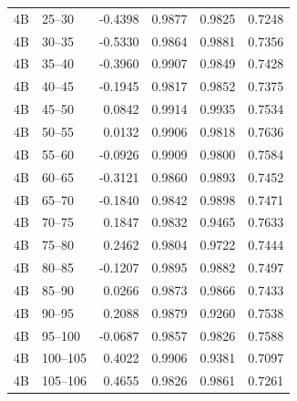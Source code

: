 \begin{table}[!htbp]
\begin{tabular}{llrrrr}
4B & 25--30 & -0.4398 & 0.9877 & 0.9825 & 0.7248 \\
4B & 30--35 & -0.5330 & 0.9864 & 0.9881 & 0.7356 \\
4B & 35--40 & -0.3960 & 0.9907 & 0.9849 & 0.7428 \\
4B & 40--45 & -0.1945 & 0.9817 & 0.9852 & 0.7375 \\
4B & 45--50 & 0.0842 & 0.9914 & 0.9935 & 0.7534 \\
4B & 50--55 & 0.0132 & 0.9906 & 0.9818 & 0.7636 \\
4B & 55--60 & -0.0926 & 0.9909 & 0.9800 & 0.7584 \\
4B & 60--65 & -0.3121 & 0.9860 & 0.9893 & 0.7452 \\
4B & 65--70 & -0.1840 & 0.9842 & 0.9898 & 0.7471 \\
4B & 70--75 & 0.1847 & 0.9832 & 0.9465 & 0.7633 \\
4B & 75--80 & 0.2462 & 0.9804 & 0.9722 & 0.7444 \\
4B & 80--85 & -0.1207 & 0.9895 & 0.9882 & 0.7497 \\
4B & 85--90 & 0.0266 & 0.9873 & 0.9866 & 0.7433 \\
4B & 90--95 & 0.2088 & 0.9879 & 0.9260 & 0.7538 \\
4B & 95--100 & -0.0687 & 0.9857 & 0.9826 & 0.7588 \\
4B & 100--105 & 0.4022 & 0.9906 & 0.9381 & 0.7097 \\
4B & 105--106 & 0.4655 & 0.9826 & 0.9861 & 0.7261 \\
\bottomrule
\end{tabular}
\end{table}

